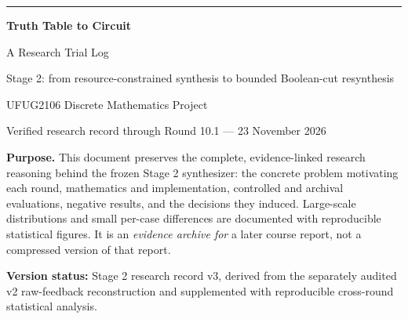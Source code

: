 \documentclass[a4paper,10pt]{article}
\theoremstyle{definition}
\theoremstyle{remark}
\newcounter{problem}
\begin{document}
\begin{titlepage}
\thispagestyle{empty}
\vspace*{1.8cm}
{\noindent\sffamily\color{ResearchBlue}\rule{\textwidth}{4pt}}\par
\vspace{1.15cm}
{\Huge\bfseries Truth Table to Circuit}\par\vspace{0.3cm}
{\LARGE A Research Trial Log\par}
\vspace{.5cm}
{\large Stage 2: from resource-constrained synthesis to bounded Boolean-cut resynthesis\par}
\vspace{1cm}
{\large UFUG2106 Discrete Mathematics Project\par}
\vspace{0.45cm}
{\large Verified research record through Round 10.1 --- 23 November 2026\par}
\vfill
\begin{tcolorbox}[colback=ResearchIvory,colframe=ResearchSlate,arc=2mm]
\textbf{Purpose.} This document preserves the complete, evidence-linked research reasoning behind the frozen Stage 2 synthesizer: the concrete problem motivating each round, mathematics and implementation, controlled and archival evaluations, negative results, and the decisions they induced. Large-scale distributions and small per-case differences are documented with reproducible statistical figures. It is an \emph{evidence archive for} a later course report, not a compressed version of that report.
\end{tcolorbox}
\vfill
\textbf{Version status:} Stage 2 research record v3, derived from the separately audited v2 raw-feedback reconstruction and supplemented with reproducible cross-round statistical analysis.\par
\end{titlepage}
\tableofcontents
\clearpage
\end{document}
